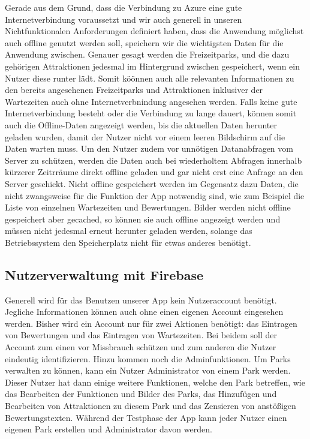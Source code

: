 Gerade aus dem Grund, dass die Verbindung zu Azure eine gute Internetverbindung voraussetzt und wir auch generell in unseren Nichtfunktionalen Anforderungen definiert haben, dass die Anwendung möglichst auch offline genutzt werden soll, speichern wir die wichtigsten Daten für die Anwendung zwischen. Genauer gesagt werden die Freizeitparks, und die dazu gehörigen Attraktionen jedesmal im Hintergrund zwischen gespeichert, wenn ein Nutzer diese runter lädt. Somit köönnen auch alle relevanten Informationen zu den bereits angesehenen Freizeitparks und Attraktionen inklusiver der Wartezeiten auch ohne Internetverbnindung angesehen werden. Falls keine gute Internetverbindung besteht oder die Verbindung zu lange dauert, können somit auch die Offline-Daten angezeigt werden, bis die aktuellen Daten herunter geladen wurden, damit der Nutzer nicht vor einem leeren Bildschirm auf die Daten warten muss. Um den Nutzer zudem vor unnötigen Datanabfragen vom Server zu schützen, werden die Daten auch bei wiederholtem Abfragen innerhalb kürzerer Zeitrräume direkt offline geladen und gar nicht erst eine Anfrage an den Server geschickt. Nicht offline gespeichert werden im Gegensatz dazu Daten, die nicht zwangsweise für die Funktion der App notwendig sind, wie zum Beispiel die Liste von einzelnen Wartezeiten und Bewertungen. Bilder werden nicht offline gespeichert aber gecached, so können sie auch offline angezeigt werden und müssen nicht jedesmal erneut herunter geladen werden, solange das Betriebssystem den Speicherplatz nicht für etwas anderes benötigt.

\subsection{Nutzerverwaltung mit Firebase}
\label{sec:implementierung:besonderheiten:firebase}

Generell wird für das Benutzen unserer App kein Nutzeraccount benötigt. Jegliche Informationen können auch ohne einen eigenen Account eingesehen werden. Bisher wird ein Account nur für zwei Aktionen benötigt: das Eintragen von Bewertungen und das Eintragen von Wartezeiten. Bei beidem soll der Account zum einen vor Missbrauch schützen und zum anderen die Nutzer eindeutig identifizieren. Hinzu kommen noch die Adminfunktionen. Um Parks verwalten zu können, kann ein Nutzer Administrator von einem Park werden. Dieser Nutzer hat dann einige weitere Funktionen, welche den Park betreffen, wie das Bearbeiten der Funktionen und Bilder des Parks, das Hinzufügen und Bearbeiten von Attraktionen zu diesem Park und das Zensieren von anstößigen Bewertungstexten. Während der Testphase der App kann jeder Nutzer einen eigenen Park erstellen und Administrator davon werden.

